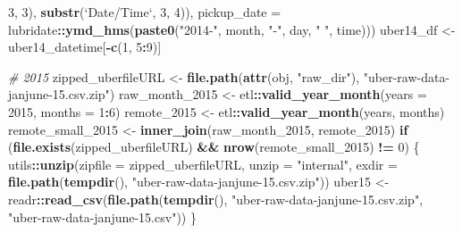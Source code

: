 \documentclass[12pt,twoside]{reedthesis}
\newenvironment{Shaded}{\begin{snugshade}}{\end{snugshade}}
\newcommand{\KeywordTok}[1]{\textcolor[rgb]{0.13,0.29,0.53}{\textbf{#1}}}
\newcommand{\DataTypeTok}[1]{\textcolor[rgb]{0.13,0.29,0.53}{#1}}
\newcommand{\DecValTok}[1]{\textcolor[rgb]{0.00,0.00,0.81}{#1}}
\newcommand{\StringTok}[1]{\textcolor[rgb]{0.31,0.60,0.02}{#1}}
\newcommand{\CommentTok}[1]{\textcolor[rgb]{0.56,0.35,0.01}{\textit{#1}}}
\newcommand{\ControlFlowTok}[1]{\textcolor[rgb]{0.13,0.29,0.53}{\textbf{#1}}}
\newcommand{\OperatorTok}[1]{\textcolor[rgb]{0.81,0.36,0.00}{\textbf{#1}}}
\newcommand{\NormalTok}[1]{#1}
\theoremstyle{definition}
\theoremstyle{definition}
\theoremstyle{definition}
\theoremstyle{remark}
\begin{document}
\begin{Shaded}
\begin{Highlighting}[]
{{{{{{{{{{            \DecValTok{3}\NormalTok{, }\DecValTok{3}\NormalTok{), }\KeywordTok{substr}\NormalTok{(}\StringTok{`}\DataTypeTok{Date/Time}\StringTok{`}\NormalTok{, }\DecValTok{3}\NormalTok{, }\DecValTok{4}\NormalTok{)), }\DataTypeTok{pickup_date =}\NormalTok{ lubridate}\OperatorTok{::}\KeywordTok{ymd_hms}\NormalTok{(}\KeywordTok{paste0}\NormalTok{(}\StringTok{"2014-"}\NormalTok{, }
\NormalTok{            month, }\StringTok{"-"}\NormalTok{, day, }\StringTok{" "}\NormalTok{, time)))}
\NormalTok{        uber14_df <-}\StringTok{ }\NormalTok{uber14_datetime[}\OperatorTok{-}\KeywordTok{c}\NormalTok{(}\DecValTok{1}\NormalTok{, }\DecValTok{5}\OperatorTok{:}\DecValTok{9}\NormalTok{)]}
        
        \CommentTok{# 2015}
\NormalTok{        zipped_uberfileURL <-}\StringTok{ }\KeywordTok{file.path}\NormalTok{(}\KeywordTok{attr}\NormalTok{(obj, }\StringTok{"raw_dir"}\NormalTok{), }
            \StringTok{"uber-raw-data-janjune-15.csv.zip"}\NormalTok{)}
\NormalTok{        raw_month_}\DecValTok{2015}\NormalTok{ <-}\StringTok{ }\NormalTok{etl}\OperatorTok{::}\KeywordTok{valid_year_month}\NormalTok{(}\DataTypeTok{years =} \DecValTok{2015}\NormalTok{, }
            \DataTypeTok{months =} \DecValTok{1}\OperatorTok{:}\DecValTok{6}\NormalTok{)}
\NormalTok{        remote_}\DecValTok{2015}\NormalTok{ <-}\StringTok{ }\NormalTok{etl}\OperatorTok{::}\KeywordTok{valid_year_month}\NormalTok{(years, months)}
\NormalTok{        remote_small_}\DecValTok{2015}\NormalTok{ <-}\StringTok{ }\KeywordTok{inner_join}\NormalTok{(raw_month_}\DecValTok{2015}\NormalTok{, remote_}\DecValTok{2015}\NormalTok{)}
        \ControlFlowTok{if}\NormalTok{ (}\KeywordTok{file.exists}\NormalTok{(zipped_uberfileURL) }\OperatorTok{&&}\StringTok{ }\KeywordTok{nrow}\NormalTok{(remote_small_}\DecValTok{2015}\NormalTok{) }\OperatorTok{!=}\StringTok{ }
\StringTok{            }\DecValTok{0}\NormalTok{) \{}
\NormalTok{            utils}\OperatorTok{::}\KeywordTok{unzip}\NormalTok{(}\DataTypeTok{zipfile =}\NormalTok{ zipped_uberfileURL, }\DataTypeTok{unzip =} \StringTok{"internal"}\NormalTok{, }
                \DataTypeTok{exdir =} \KeywordTok{file.path}\NormalTok{(}\KeywordTok{tempdir}\NormalTok{(), }\StringTok{"uber-raw-data-janjune-15.csv.zip"}\NormalTok{))}
\NormalTok{            uber15 <-}\StringTok{ }\NormalTok{readr}\OperatorTok{::}\KeywordTok{read_csv}\NormalTok{(}\KeywordTok{file.path}\NormalTok{(}\KeywordTok{tempdir}\NormalTok{(), }\StringTok{"uber-raw-data-janjune-15.csv.zip"}\NormalTok{, }
                \StringTok{"uber-raw-data-janjune-15.csv"}\NormalTok{))}
\NormalTok{        \}}
        
}}}}}}}}}}
\end{Highlighting}
\end{Shaded}
\end{document}
